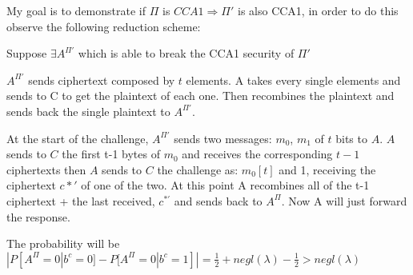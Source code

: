 My goal is to demonstrate if $\Pi$ is $CCA1 \Rightarrow \Pi'$ is also CCA1, in order to do this observe the following reduction scheme:

Suppose $\exists A^{\Pi'}$ which is able to break the CCA1 security of $\Pi'$
\begin{figure}[h!]
    \centering
    \sdinit{}
\end{figure}


$A^{\Pi'}$ sends ciphertext composed by $t$ elements. A takes every single elements and sends to C to get the plaintext of each one.
Then recombines the plaintext and sends back the single plaintext to $A^{\Pi'}$.

At the start of the challenge, $A^{\Pi'}$ sends two messages: $m_0$, $m_1$ of $t$ bits to $A$.
$A$ sends to $C$ the first t-1 bytes of $m_0$ and receives the corresponding $t-1$ ciphertexts then $A$ sends to $C$ the challenge as: $m_0[t]$ and 1, receiving the ciphertext $c*'$ of one of the two.
At this point A recombines all of the t-1 ciphertext + the last received, $c^{*\prime}$ and sends back to $A^{\Pi}$.
Now A will just forward the response.

The probability will be $|P[A^{\Pi}=0 | b^c=0]-P[A^{\Pi}=0 | b^c=1]|=\frac{1}{2}+negl(\lambda)-\frac{1}{2}>negl(\lambda)$ 

